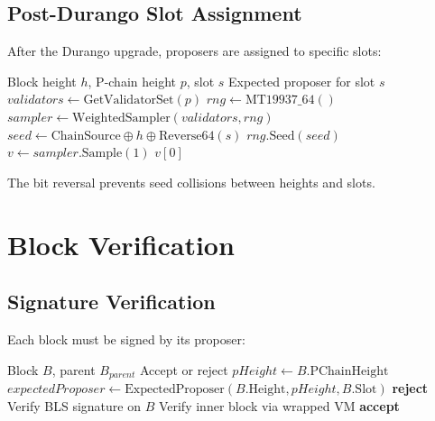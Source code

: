 \documentclass[11pt,letterpaper]{article}
\begin{document}
\subsection{Post-Durango Slot Assignment}

After the Durango upgrade, proposers are assigned to specific slots:

\begin{algorithm}
\caption{Slot-Based Proposer Assignment}
\label{alg:slot}
\begin{algorithmic}[1]
\Require Block height $h$, P-chain height $p$, slot $s$
\Ensure Expected proposer for slot $s$
\State $validators \gets \text{GetValidatorSet}(p)$
\State $rng \gets \text{MT19937\_64}()$
\State $sampler \gets \text{WeightedSampler}(validators, rng)$
\State $seed \gets \text{ChainSource} \oplus h \oplus \text{Reverse64}(s)$
\State $rng.\text{Seed}(seed)$
\State $v \gets sampler.\text{Sample}(1)$
\State \Return $v[0]$
\end{algorithmic}
\end{algorithm}

The bit reversal prevents seed collisions between heights and slots.

\section{Block Verification}

\subsection{Signature Verification}

Each block must be signed by its proposer:

\begin{algorithm}
\caption{Block Verification}
\label{alg:verify}
\begin{algorithmic}[1]
\Require Block $B$, parent $B_{parent}$
\Ensure Accept or reject
\State $pHeight \gets B.\text{PChainHeight}$
\State $expectedProposer \gets \text{ExpectedProposer}(B.\text{Height}, pHeight, B.\text{Slot})$
        \State \Return \textbf{reject} 
    \EndIf
\EndIf
\State Verify BLS signature on $B$
\State Verify inner block via wrapped VM
\State \Return \textbf{accept}
\end{algorithmic}
\end{algorithm}
\end{document}
